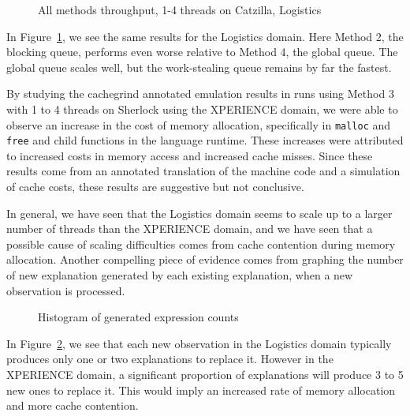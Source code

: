 \begin{figure}[!htbp]
\begin{centering}
\texttt{[image: \{\{images/threads-log3-catzilla.inf.ed.ac.uk-all-2]}}}
\end{centering}
\caption{All methods throughput, 1-4 threads on Catzilla, Logistics}
\label{fig:thread-cal-2}
\end{figure}

In Figure~\ref{fig:thread-cal-2}, we see the same results for the Logistics domain. Here Method 2, the blocking queue, performs even worse relative to Method 4, the global queue. The global queue scales well, but the work-stealing queue remains by far the fastest.

By studying the cachegrind annotated emulation results in runs using Method 3 with 1 to 4 threads on Sherlock using the XPERIENCE domain, we were able to observe an increase in the cost of memory allocation, specifically in \texttt{malloc} and \texttt{free} and child functions in the language runtime. These increases were attributed to increased costs in memory access and increased cache misses. Since these results come from an annotated translation of the machine code and a simulation of cache costs, these results are suggestive but not conclusive.

In general, we have seen that the Logistics domain seems to scale up to a larger number of threads than the XPERIENCE domain, and we have seen that a possible cause of scaling difficulties comes from cache contention during memory allocation. Another compelling piece of evidence comes from graphing the number of new explanation generated by each existing explanation, when a new observation is processed.

\begin{figure}[!htbp]
\begin{centering}
\texttt{[image: \{\{images/histogram]}}}
\end{centering}
\caption{Histogram of generated expression counts}
\label{fig:hist}
\end{figure}

In Figure~\ref{fig:hist}, we see that each new observation in the Logistics domain typically produces only one or two explanations to replace it. However in the XPERIENCE domain, a significant proportion of explanations will produce 3 to 5 new ones to replace it. This would imply an increased rate of memory allocation and more cache contention.